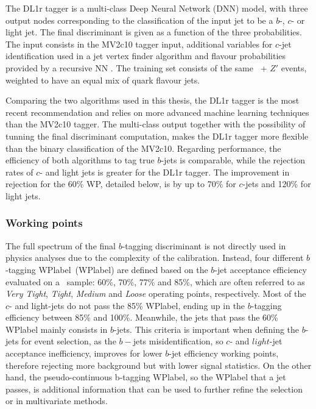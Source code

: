 The DL1r tagger is a multi-class Deep Neural Network (DNN) model, with three output nodes corresponding to the classification of the input jet to be a $b$-, $c$- or light jet. The final discriminant is given as a function of the three probabilities. The input consists in the MV2c10 tagger input, additional variables for $c$-jet identification used in a jet vertex finder algorithm and flavour probabilities provided by a recursive NN . The training set consists of the same \ttbar\ + $Z'$ events, weighted to have an equal mix of quark flavour jets.

Comparing the two algorithms used in this thesis, the DL1r tagger is the most recent recommendation and relies on more advanced machine learning techniques than the MV2c10 tagger. The multi-class output together with the possibility of tunning the final discriminant computation, makes the DL1r tagger more flexible than the binary classification of the MV2c10. Regarding performance, the efficiency of both algorithms to tag true $b$-jets is comparable, while the rejection rates of $c$- and light jets is greater for the DL1r tagger. The improvement in rejection for the 60\% WP, detailed below, is by up to 70\% for $c$-jets and 120\% for light jets.


\subsubsection{Working points}

The full spectrum of the final $b$-tagging discriminant is not directly used in physics analyses due to the complexity of the calibration. Instead, four different $b$-tagging \acrlong{WPlabel}~(\acrshort{WPlabel}) are defined based on the $b$-jet acceptance efficiency evaluated on a \ttbar\ sample: 60\%, 70\%, 77\% and 85\%, which are often referred to as \textit{Very Tight}, \textit{Tight}, \textit{Medium} and \textit{Loose} operating points, respectively. Most of the $c$- and light-jets do not pass the 85\% \acrshort{WPlabel}, ending up in the $b$-tagging efficiency between 85\% and 100\%. Meanwhile, the jets that pass the 60\% \acrshort{WPlabel} mainly consists in $b$-jets. This criteria is important when defining the $b$-jets for event selection, as the $b-$jets misidentification, so $c$- and $light$-jet acceptance inefficiency, improves for lower $b$-jet efficiency working points, therefore rejecting more background but with lower signal statistics. On the other hand, the pseudo-continuous b-tagging \acrshort{WPlabel}, so the \acrshort{WPlabel} that a jet passes, is additional information that can be used to further refine the selection or in multivariate methods.

